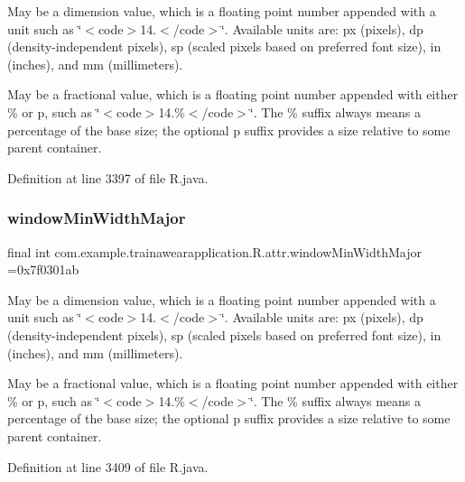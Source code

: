 May be a dimension value, which is a floating point number appended with a unit such as \char`\"{}$<$code$>$14.\+5sp$<$/code$>$\char`\"{}. Available units are\+: px (pixels), dp (density-\/independent pixels), sp (scaled pixels based on preferred font size), in (inches), and mm (millimeters). 

May be a fractional value, which is a floating point number appended with either \% or p, such as \char`\"{}$<$code$>$14.\%$<$/code$>$\char`\"{}. The \% suffix always means a percentage of the base size; the optional p suffix provides a size relative to some parent container. 

Definition at line 3397 of file R.\+java.

\mbox{\label{classcom_1_1example_1_1trainawearapplication_1_1_r_1_1attr_a50c58fbb0c69bef0302b1a976c09da4f}} 
\subsubsection{\texorpdfstring{windowMinWidthMajor}{windowMinWidthMajor}}
{\footnotesize\ttfamily final int com.\+example.\+trainawearapplication.\+R.\+attr.\+window\+Min\+Width\+Major =0x7f0301ab\hspace{0.3cm}{\ttfamily [static]}}

May be a dimension value, which is a floating point number appended with a unit such as \char`\"{}$<$code$>$14.\+5sp$<$/code$>$\char`\"{}. Available units are\+: px (pixels), dp (density-\/independent pixels), sp (scaled pixels based on preferred font size), in (inches), and mm (millimeters). 

May be a fractional value, which is a floating point number appended with either \% or p, such as \char`\"{}$<$code$>$14.\%$<$/code$>$\char`\"{}. The \% suffix always means a percentage of the base size; the optional p suffix provides a size relative to some parent container. 

Definition at line 3409 of file R.\+java.

\mbox{\label{classcom_1_1example_1_1trainawearapplication_1_1_r_1_1attr_ae5a639562b2329aeae3f0f0cb8093450}} 
